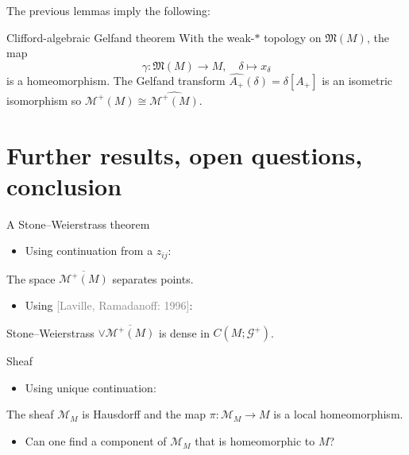 \documentclass[aspectratio=169,handout]{beamer}
\newcommand\grey[1]{\textcolor{gray}{#1}}
\newcommand{\G}{\mathcal{G}}
\newcommand{\characters}{\mathfrak{M}}
\newcommand{\monogenics}{\mathcal{M}}
\begin{document}
\begin{frame}{}
\vfill
The previous lemmas imply the following:
\pause
\begin{thm*}{Clifford-algebraic Gelfand theorem}{}
With the weak-$\ast$ topology on $\characters(M)$, the map
\[
\gamma \colon \characters(M) \to M, \quad \delta \mapsto x_\delta
\]
is a homeomorphism. The Gelfand transform $\widehat{A_+}(\delta)=\delta[A_+]$ is an isometric isomorphism so $\monogenics^+(M) \cong \widehat{\monogenics^+(M)}$.
\end{thm*}
\vfill
\end{frame}




\section{Further results, open questions, conclusion}
%
\begin{frame}{A Stone--Weierstrass theorem}{}
\vfill
\pause
\begin{itemize}
  \item Using continuation from a $z_{ij}$:
\end{itemize}
\begin{lemm*}{}{}
The space $\overline{\monogenics^+(M)}$ separates points.
\end{lemm*}
\pause
\begin{itemize}
  \item Using \grey{[Laville, Ramadanoff: 1996]}:
\end{itemize}
\pause
\begin{thm*}{Stone--Weierstrass}{}
$\vee \overline{\monogenics^+(M)}$ is dense in $C(M;\G^+)$.
\end{thm*}
\vfill
\end{frame}

\begin{frame}{Sheaf}
\vfill
\pause
\begin{itemize}
  \item Using unique continuation:
\end{itemize}
\pause
\begin{thm*}{}{}
The sheaf $\monogenics_M$ is Hausdorff and the map $\pi \colon \monogenics_M \to M$ is a local homeomorphism.
\end{thm*}
\pause
\begin{itemize}
  \item Can one find a component of $\monogenics_M$ that is homeomorphic to $M$?
\end{itemize}
\vfill
\end{frame}
\end{document}
